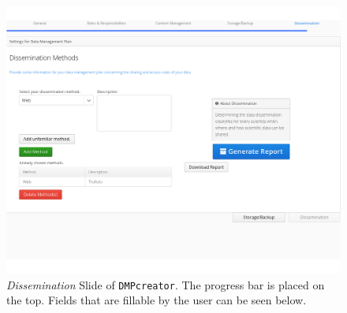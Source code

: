 \begin{landscape}
\begin{figure}[]
	\centering
	\includegraphics[width=1.2\textwidth]{pictures/Dissemination.png}
	\caption{\textit{Dissemination} Slide of \texttt{DMPcreator}. The progress bar is placed on the top. Fields that are fillable by the user can be seen below.}
	\label{Dissemination}
\end{figure}
\end{landscape}